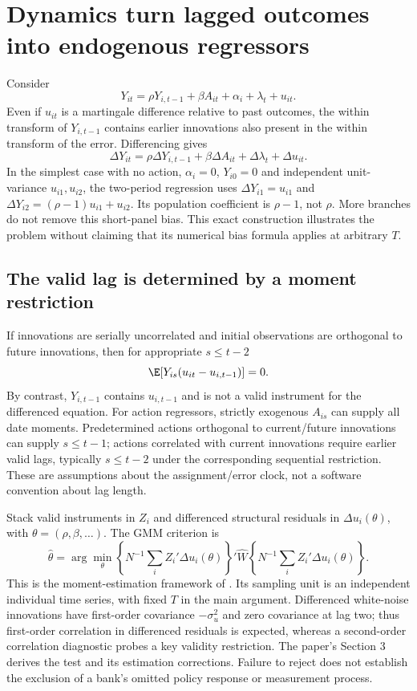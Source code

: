 \section{Dynamics turn lagged outcomes into endogenous regressors}
\label{r3:dynamic-panel}
Consider
\begin{equation}
 Y_{it}=\rho Y_{i,t-1}+\beta A_{it}+\alpha_i+\lambda_t+u_{it}.
 \label{r3:dynamic-panel-model}
\end{equation}
Even if $u_{it}$ is a martingale difference relative to past outcomes,
the within transform of $Y_{i,t-1}$ contains earlier innovations
also present in the within transform of the error. Differencing gives
\[
 \Delta Y_{it}=\rho\Delta Y_{i,t-1}+\beta\Delta A_{it}
                        +\Delta\lambda_t+\Delta u_{it}.
\]
In the simplest case with no action, $\alpha_i=0$, $Y_{i0}=0$
and independent unit-variance $u_{i1},u_{i2}$, the two-period
regression uses $\Delta Y_{i1}=u_{i1}$ and
$\Delta Y_{i2}=(\rho-1)u_{i1}+u_{i2}$. Its population coefficient
is $\rho-1$, not $\rho$. More branches do not remove this short-panel
bias. This exact construction illustrates the problem without claiming
that its numerical bias formula applies at arbitrary $T$.

\subsection{The valid lag is determined by a moment restriction}
If innovations are serially uncorrelated and initial observations are
orthogonal to future innovations, then for appropriate $s\le t-2$
\begin{equation}
 \E[Y_{is}(u_{it}-u_{i,t-1})]=0.
 \label{r3:ab-moments}
\end{equation}
By contrast, $Y_{i,t-1}$ contains $u_{i,t-1}$ and is not a valid
instrument for the differenced equation. For action regressors, strictly
exogenous $A_{is}$ can supply all date moments. Predetermined actions
orthogonal to current/future innovations can supply $s\le t-1$;
actions correlated with current innovations require earlier valid
lags, typically $s\le t-2$ under the corresponding sequential
restriction. These are assumptions about the assignment/error clock,
not a software convention about lag length.

Stack valid instruments in $Z_i$ and differenced structural residuals
in $\Delta u_i(\theta)$, with $\theta=(\rho,\beta,\ldots)$.
The GMM criterion is
\[
 \widehat\theta=\arg\min_\theta
 \left\{N^{-1}\sum_i Z_i'\Delta u_i(\theta)\right\}'\widehat W
 \left\{N^{-1}\sum_i Z_i'\Delta u_i(\theta)\right\}.
\]
This is the moment-estimation framework of
\citet[Section 2, equations (2)--(6)]{arellano1991}. Its sampling
unit is an independent individual time series, with fixed $T$ in the
main argument. Differenced white-noise innovations have first-order
covariance $-\sigma_u^2$ and zero covariance at lag two; thus first-order
correlation in differenced residuals is expected, whereas a second-order
correlation diagnostic probes a key validity restriction. The paper's
Section 3 derives the test and its estimation corrections. Failure to
reject does not establish the exclusion of a bank's omitted policy
response or measurement process.

